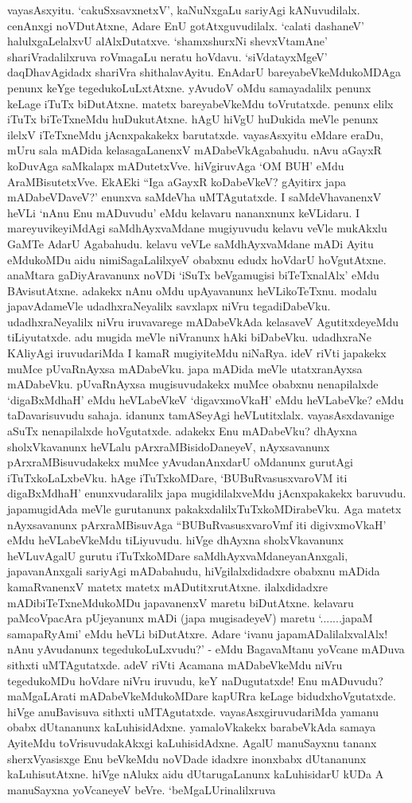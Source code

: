 vayasAsxyitu. `cakuSxsavxnetxV', kaNuNxgaLu sariyAgi kANuvudilalx. cenAnxgi noVDutAtxne, Adare EnU gotAtxguvudilalx. `calati dashaneV' halulxgaLelalxvU alAlxDutatxve. `shamxshurxNi shevxVtamAne' shariVradalilxruva roVmagaLu neratu hoVdavu. `siVdatayxMgeV' daqDhavAgidadx shariVra shithalavAyitu. EnAdarU bareyabeVkeMdukoMDAga penunx keYge tegedukoLuLxtAtxne. yAvudoV oMdu samayadalilx penunx keLage iTuTx biDutAtxne. matetx bareyabeVkeMdu toVrutatxde. penunx elilx iTuTx biTeTxneMdu huDukutAtxne. hAgU hiVgU huDukida meVle penunx ilelxV iTeTxneMdu jAcnxpakakekx barutatxde. vayasAsxyitu eMdare eraDu, mUru sala mADida kelasagaLanenxV mADabeVkAgabahudu. nAvu aGayxR koDuvAga saMkalapx mADutetxVve. hiVgiruvAga `OM BUH' eMdu AraMBisutetxVve. EkAEki ``Iga aGayxR koDabeVkeV? gAyitirx japa mADabeVDaveV?' enunxva saMdeVha uMTAgutatxde. I saMdeVhavanenxV heVLi `nAnu Enu mADuvudu' eMdu kelavaru nananxnunx keVLidaru. I mareyuvikeyiMdAgi saMdhAyxvaMdane mugiyuvudu kelavu veVle mukAkxlu GaMTe AdarU Agabahudu. kelavu veVLe saMdhAyxvaMdane mADi Ayitu eMdukoMDu aidu nimiSagaLalilxyeV obabxnu edudx hoVdarU hoVgutAtxne. anaMtara gaDiyAravanunx noVDi `iSuTx beVgamugisi biTeTxnalAlx' eMdu BAvisutAtxne. adakekx nAnu oMdu upAyavanunx heVLikoTeTxnu. modalu japavAdameVle udadhxraNeyalilx savxlapx niVru tegadiDabeVku. udadhxraNeyalilx niVru iruvavarege mADabeVkAda kelasaveV AgutitxdeyeMdu tiLiyutatxde. adu mugida meVle niVranunx hAki biDabeVku. udadhxraNe KAliyAgi iruvudariMda I kamaR mugiyiteMdu niNaRya. ideV riVti japakekx muMce pUvaRnAyxsa mADabeVku. japa mADida meVle utatxranAyxsa mADabeVku. pUvaRnAyxsa mugisuvudakekx muMce obabxnu nenapilalxde `digaBxMdhaH' eMdu heVLabeVkeV `digavxmoVkaH' eMdu heVLabeVke? eMdu taDavarisuvudu sahaja. idanunx tamASeyAgi heVLutitxlalx. vayasAsxdavanige aSuTx nenapilalxde hoVgutatxde. adakekx Enu mADabeVku? dhAyxna sholxVkavanunx heVLalu pArxraMBisidoDaneyeV, nAyxsavanunx pArxraMBisuvudakekx muMce yAvudanAnxdarU oMdanunx gurutAgi iTuTxkoLaLxbeVku. hAge iTuTxkoMDare, `BUBuRvasusxvaroVM iti digaBxMdhaH' enunxvudaralilx japa mugidilalxveMdu jAcnxpakakekx baruvudu. japamugidAda meVle gurutanunx pakakxdalilxTuTxkoMDirabeVku. Aga matetx nAyxsavanunx pArxraMBisuvAga ``BUBuRvasusxvaroVmf iti digivxmoVkaH' eMdu heVLabeVkeMdu tiLiyuvudu. hiVge dhAyxna sholxVkavanunx heVLuvAgalU gurutu iTuTxkoMDare saMdhAyxvaMdaneyanAnxgali, japavanAnxgali sariyAgi mADabahudu, hiVgilalxdidadxre obabxnu mADida kamaRvanenxV matetx matetx mADutitxrutAtxne. ilalxdidadxre mADibiTeTxneMdukoMDu japavanenxV maretu biDutAtxne. kelavaru paMcoVpacAra pUjeyanunx mADi (japa mugisadeyeV) maretu `.......japaM samapaRyAmi' eMdu heVLi biDutAtxre. Adare `ivanu japamADalilalxvalAlx! nAnu yAvudanunx tegedukoLuLxvudu?' - eMdu BagavaMtanu yoVcane mADuva sithxti uMTAgutatxde. adeV riVti Acamana mADabeVkeMdu niVru tegedukoMDu hoVdare niVru iruvudu, keY naDugutatxde! Enu mADuvudu? maMgaLArati mADabeVkeMdukoMDare kapURra keLage bidudxhoVgutatxde. hiVge anuBavisuva sithxti uMTAgutatxde. vayasAsxgiruvudariMda yamanu obabx dUtananunx kaLuhisidAdxne. yamaloVkakekx barabeVkAda samaya AyiteMdu toVrisuvudakAkxgi kaLuhisidAdxne. AgalU manuSayxnu tananx sherxVyasisxge Enu beVkeMdu noVDade idadxre inonxbabx dUtananunx kaLuhisutAtxne. hiVge nAlukx aidu dUtarugaLanunx kaLuhisidarU kUDa A manuSayxna yoVcaneyeV beVre. `beMgaLUrinalilxruva 